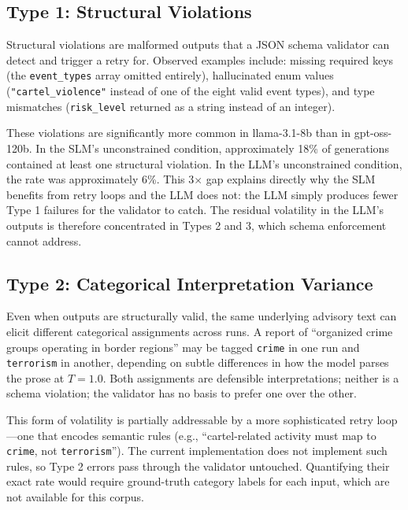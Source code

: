 \documentclass[sigconf]{acmart}
\begin{document}
\subsection{Type 1: Structural Violations}

Structural violations are malformed outputs that a JSON schema validator can detect and trigger a retry for. Observed examples include: missing required keys (the \texttt{event\_types} array omitted entirely), hallucinated enum values (\texttt{"cartel\_violence"} instead of one of the eight valid event types), and type mismatches (\texttt{risk\_level} returned as a string instead of an integer).

These violations are significantly more common in llama-3.1-\allowbreak 8b than in gpt-oss-\allowbreak 120b. In the SLM's unconstrained condition, approximately 18\% of generations contained at least one structural violation. In the LLM's unconstrained condition, the rate was approximately 6\%. This 3$\times$ gap explains directly why the SLM benefits from retry loops and the LLM does not: the LLM simply produces fewer Type 1 failures for the validator to catch. The residual volatility in the LLM's outputs is therefore concentrated in Types 2 and 3, which schema enforcement cannot address.

\subsection{Type 2: Categorical Interpretation Variance}

Even when outputs are structurally valid, the same underlying advisory text can elicit different categorical assignments across runs. A report of ``organized crime groups operating in border regions'' may be tagged \texttt{crime} in one run and \texttt{terrorism} in another, depending on subtle differences in how the model parses the prose at $T{=}1.0$. Both assignments are defensible interpretations; neither is a schema violation; the validator has no basis to prefer one over the other.

This form of volatility is partially addressable by a more sophisticated retry loop---one that encodes semantic rules (e.g., ``cartel-related activity must map to \texttt{crime}, not \texttt{terrorism}''). The current implementation does not implement such rules, so Type 2 errors pass through the validator untouched. Quantifying their exact rate would require ground-truth category labels for each input, which are not available for this corpus.
\end{document}
